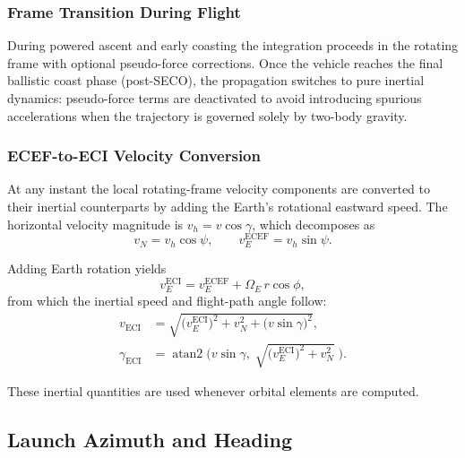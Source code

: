 \subsubsection{Frame Transition During Flight}

During powered ascent and early coasting the integration proceeds in the
rotating frame with optional pseudo-force corrections.  Once the vehicle
reaches the final ballistic coast phase (post-SECO), the propagation switches
to pure inertial dynamics: pseudo-force terms are deactivated to avoid
introducing spurious accelerations when the trajectory is governed solely by
two-body gravity.

\subsubsection{ECEF-to-ECI Velocity Conversion}

At any instant the local rotating-frame velocity components are converted to
their inertial counterparts by adding the Earth's rotational eastward speed.
The horizontal velocity magnitude is $v_h = v\cos\gamma$, which decomposes as
\begin{equation}
  v_N = v_h\cos\psi, \qquad
  v_E^{\text{ECEF}} = v_h\sin\psi.
  \label{eq:vel_ecef}
\end{equation}

Adding Earth rotation yields
\begin{equation}
  v_E^{\text{ECI}} = v_E^{\text{ECEF}} + \Omega_E\, r\cos\phi,
  \label{eq:ve_eci}
\end{equation}
from which the inertial speed and flight-path angle follow:
\begin{align}
  v_{\text{ECI}} &= \sqrt{\bigl(v_E^{\text{ECI}}\bigr)^2 + v_N^2
                    + \bigl(v\sin\gamma\bigr)^2}, \label{eq:v_eci} \\[4pt]
  \gamma_{\text{ECI}} &= \operatorname{atan2}\!\bigl(v\sin\gamma,\;
                    \sqrt{\bigl(v_E^{\text{ECI}}\bigr)^2 + v_N^2}\;\bigr).
                    \label{eq:gamma_eci}
\end{align}

These inertial quantities are used whenever orbital elements are computed.

\subsection{Launch Azimuth and Heading}
\label{ssec:azimuth_heading}


